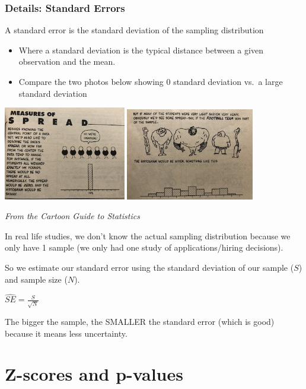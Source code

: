 \documentclass[
  letterpaper,
  DIV=11,
  numbers=noendperiod]{scrreprt}
\providecommand{\tightlist}{%
  \setlength{\itemsep}{0pt}\setlength{\parskip}{0pt}}\usepackage{longtable,booktabs,array}
\begin{document}
\hypertarget{details-standard-errors}{%
\subsubsection{Details: Standard Errors}\label{details-standard-errors}}

A standard error is the standard deviation of the sampling distribution

\begin{itemize}
\tightlist
\item
  Where a standard deviation is the typical distance between a given
  observation and the mean.
\item
  Compare the two photos below showing 0 standard deviation vs.~a large
  standard deviation
\end{itemize}

\includegraphics[width=0.4\textwidth,height=\textheight]{images/spread1.png}
\includegraphics[width=0.42\textwidth,height=\textheight]{images/spread2.jpg}

\emph{From the Cartoon Guide to Statistics}

In real life studies, we don't know the actual sampling distribution
because we only have 1 sample (we only had one study of
applications/hiring decisions).

So we estimate our standard error using the standard deviation of our
sample (\(S\)) and sample size (\(N\)).

\({\hat {SE}} = \frac{S}{\sqrt{N}}\)

The bigger the sample, the SMALLER the standard error (which is good)
because it means less uncertainty.

\hypertarget{z-scores-and-p-values}{%
\section{Z-scores and p-values}\label{z-scores-and-p-values}}
\end{document}
